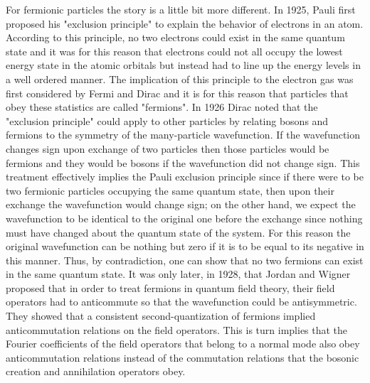 For fermionic particles the story is a little bit more different.
In 1925, Pauli first proposed his "exclusion principle" to explain the behavior
of electrons in an atom. According to this principle, no two electrons could
exist in the same quantum state and it was for this reason that electrons could not
all occupy the lowest energy state in the atomic orbitals but instead had to line up
the energy levels in a well ordered manner. The implication of this principle to the
electron gas was first considered by Fermi and Dirac and it is for this reason that
particles that obey these statistics are called "fermions". In 1926 Dirac noted that
the "exclusion principle" could apply to other particles by relating bosons and
fermions to the symmetry of the many-particle wavefunction. If the wavefunction
changes sign upon exchange of two particles then those particles would be fermions
and they would be bosons if the wavefunction did not change sign. This treatment
effectively implies the Pauli exclusion principle since if there were to be two
fermionic particles occupying the same quantum state, then upon their exchange
the wavefunction would change sign; on the other hand, we expect the wavefunction
to be identical to the original one before the exchange since nothing must have
changed about the quantum state of the system. For this reason the original
wavefunction can be nothing but zero if it is to be equal to its negative in
this manner. Thus, by contradiction, one can show that no two fermions can exist
in the same quantum state. It was only later, in 1928, that Jordan and Wigner
proposed that in order to treat fermions in quantum field theory, their field
operators had to anticommute so that the wavefunction could be antisymmetric.
They showed that a consistent second-quantization of fermions implied anticommutation
relations on the field operators. This is turn implies that the Fourier coefficients
of the field operators that belong to a normal mode also obey anticommutation
relations instead of the commutation relations that the bosonic creation and
annihilation operators obey.

